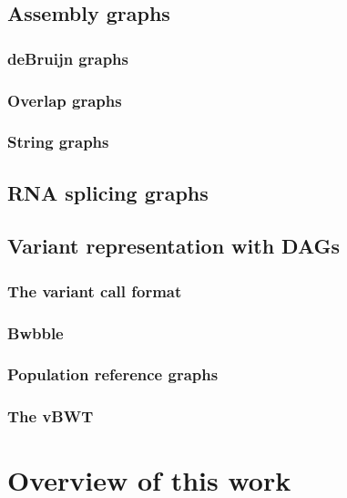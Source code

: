 
\subsection{Assembly graphs}

\subsubsection{deBruijn graphs}

\subsubsection{Overlap graphs}

\subsubsection{String graphs}


\subsection{RNA splicing graphs}

\subsection{Variant representation with DAGs}

\subsubsection{The variant call format}

\subsubsection{Bwbble}

\subsubsection{Population reference graphs}

\subsubsection{The vBWT}

\section{Overview of this work}

 
